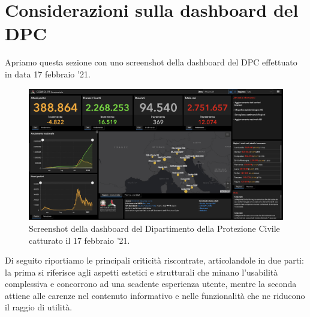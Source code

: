 \documentclass[../../main.tex]{subfiles}
\begin{document}
\section{Considerazioni sulla dashboard del DPC}\label{s:considerazioni}
Apriamo questa sezione con uno screenshot della dashboard del DPC effettuato in data 17 febbraio '21.

\begin{figure}[h]
    \centering
    \includegraphics[width = \textwidth]{res/img/screenshot-dashboard-DPC}
    \caption{Screenshot della dashboard del Dipartimento della Protezione Civile catturato il 17 febbraio '21.}
    \label{fig:screen-dashboard-DPC}
\end{figure}

Di seguito riportiamo le principali criticità riscontrate, articolandole in due parti: la prima si riferisce agli aspetti estetici e strutturali che minano l'usabilità complessiva e concorrono ad una scadente esperienza utente, mentre la seconda attiene alle carenze nel contenuto informativo e nelle funzionalità che ne riducono il raggio di utilità.
\end{document}
